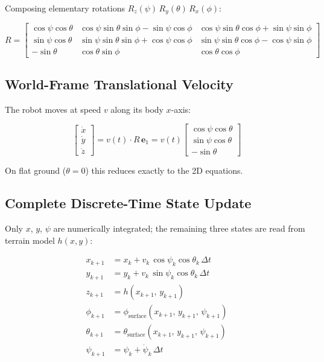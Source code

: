 \documentclass[12pt,a4paper]{article}
\newcommand{\cph}{\cos\phi}
\newcommand{\sph}{\sin\phi}
\newcommand{\cth}{\cos\theta}
\newcommand{\sth}{\sin\theta}
\newcommand{\cps}{\cos\psi}
\newcommand{\sps}{\sin\psi}
\newcommand{\eone}{\mathbf{e}_1}
\begin{document}
Composing elementary rotations $R_z(\psi)\,R_y(\theta)\,R_x(\phi)$:

\begin{equation}
  R =
  \begin{bmatrix}
    \cps\cth & \cps\sth\sph - \sps\cph & \cps\sth\cph + \sps\sph \\
    \sps\cth & \sps\sth\sph + \cps\cph & \sps\sth\cph - \cps\sph \\
    -\sth    & \cth\sph                & \cth\cph
  \end{bmatrix}
  \tag{27}
\end{equation}

\subsection{World-Frame Translational Velocity}

The robot moves at speed $v$ along its body $x$-axis:

\begin{equation}
  \begin{bmatrix}\dot x \\ \dot y \\ \dot z\end{bmatrix}
  = v(t)\cdot R\,\eone
  = v(t)\begin{bmatrix}\cps\cth \\ \sps\cth \\ -\sth\end{bmatrix}
  \tag{28}
\end{equation}

On flat ground ($\theta=0$) this reduces exactly to the 2D equations.

\subsection{Complete Discrete-Time State Update}

Only $x$, $y$, $\psi$ are numerically integrated;
the remaining three states are read from terrain model $h(x,y)$:

\begin{equation}
  \boxed{
  \begin{aligned}
    x_{k+1}      &= x_k      + v_k\,\cps_k\cth_k\,\Delta t \\
    y_{k+1}      &= y_k      + v_k\,\sps_k\cth_k\,\Delta t \\
    z_{k+1}      &= h(x_{k+1},\,y_{k+1}) \\
    \phi_{k+1}   &= \phi_{\text{surface}}(x_{k+1},\,y_{k+1},\,\psi_{k+1}) \\
    \theta_{k+1} &= \theta_{\text{surface}}(x_{k+1},\,y_{k+1},\,\psi_{k+1}) \\
    \psi_{k+1}   &= \psi_k   + \dot\psi_k\,\Delta t
  \end{aligned}
  }
  \tag{29}
\end{equation}
\end{document}
